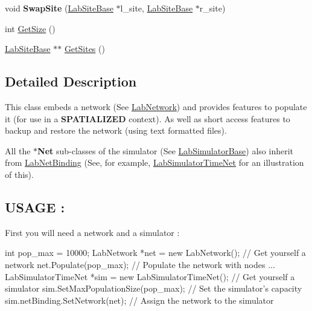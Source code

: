 \begin{DoxyCompactItemize}
\item 
\hypertarget{classelps_1_1_lab_net_binding_a1e863c41bf46554eb39415589fe72d2d}{void {\bfseries Swap\+Site} (\hyperlink{classelps_1_1_lab_site_base}{Lab\+Site\+Base} $\ast$l\+\_\+site, \hyperlink{classelps_1_1_lab_site_base}{Lab\+Site\+Base} $\ast$r\+\_\+site)}\label{classelps_1_1_lab_net_binding_a1e863c41bf46554eb39415589fe72d2d}

\item 
int \hyperlink{classelps_1_1_lab_net_binding_ad52abc34503cad76896a71d947354b16}{Get\+Size} ()
\item 
\hyperlink{classelps_1_1_lab_site_base}{Lab\+Site\+Base} $\ast$$\ast$ \hyperlink{classelps_1_1_lab_net_binding_ac22981cecb4e1fbc8f1d20008b1c9eb9}{Get\+Sites} ()
\end{DoxyCompactItemize}


\subsection{Detailed Description}
This class embeds a network (See \hyperlink{classelps_1_1_lab_network}{Lab\+Network}) and provides features to populate it (for use in a {\bfseries S\+P\+A\+T\+I\+A\+L\+I\+Z\+E\+D} context). As well as short access features to backup and restore the network (using text formatted files).

All the {\bfseries $\ast$\+Net} sub-\/classes of the simulator (See \hyperlink{classelps_1_1_lab_simulator_base}{Lab\+Simulator\+Base}) also inherit from \hyperlink{classelps_1_1_lab_net_binding}{Lab\+Net\+Binding} (See, for example, \hyperlink{classelps_1_1_lab_simulator_time_net}{Lab\+Simulator\+Time\+Net} for an illustration of this).

\subsection*{U\+S\+A\+G\+E \+: }

First you will need a network and a simulator \+:


\begin{DoxyCode}
\textcolor{keywordtype}{int} pop\_max = 10000;
LabNetwork *net = \textcolor{keyword}{new} LabNetwork();                      \textcolor{comment}{// Get yourself a network}
net.Populate(pop\_max);                                   \textcolor{comment}{// Populate the network with nodes}
...
LabSimulatorTimeNet *sim = \textcolor{keyword}{new} LabSimulatorTimeNet();    \textcolor{comment}{// Get yourself a simulator}
sim.SetMaxPopulationSize(pop\_max);                       \textcolor{comment}{// Set the simulator's capacity}
sim.netBinding.SetNetwork(net);                          \textcolor{comment}{// Assign the network to the simulator}
\end{DoxyCode}


